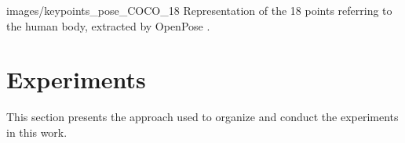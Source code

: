 
    {images/keypoints_pose_COCO_18}
    {Representation of the 18 points referring to the human body, extracted by OpenPose \cite{openpose-output-2018}.}



\section{Experiments} %
\label{sec:experimentos}

This section presents the approach used to organize and conduct the experiments in this work. 

